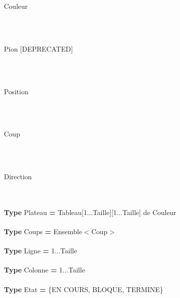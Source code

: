 \begin{algorithme}
	\begin{enregistrement}{Couleur}
	\end{enregistrement}
\\ \\
	\begin{enregistrement}{Pion [DEPRECATED]}
	\end{enregistrement}
\\ \\
	\begin{enregistrement}{Position}
	\end{enregistrement}
\\ \\
	\begin{enregistrement}{Coup}
	\end{enregistrement}
\\ \\
	\begin{enregistrement}{Direction}
	\end{enregistrement}
\\ \\
	\textbf{Type} Plateau \textbf{=} Tableau[1...Taille][1...Taille] de Couleur
\\ \\
	\textbf{Type} Coups \textbf{=} Ensemble$<$Coup$>$
\\ \\
	\textbf{Type} Ligne \textbf{=} 1...Taille
\\ \\
	\textbf{Type} Colonne \textbf{=} 1...Taille
\\ \\
	\textbf{Type} Etat \textbf{=} {\{EN COURS, BLOQUE, TERMINE\}}
\end{algorithme}
